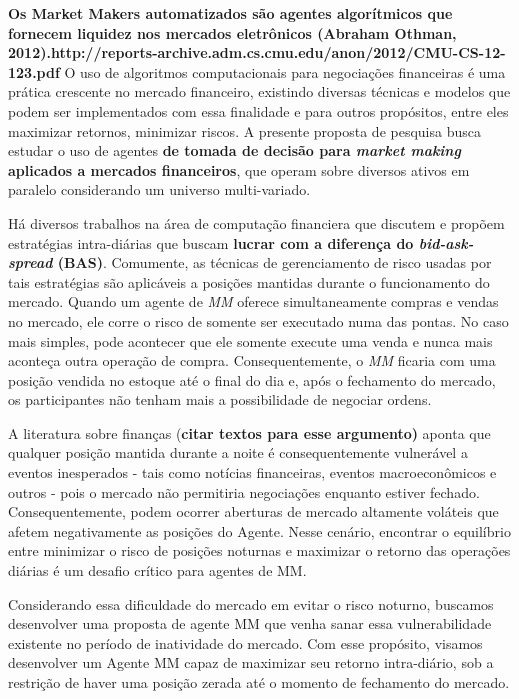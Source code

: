 \textbf{Os Market Makers automatizados são agentes algorítmicos que fornecem liquidez nos mercados eletrônicos (Abraham Othman, 2012).http://reports-archive.adm.cs.cmu.edu/anon/2012/CMU-CS-12-123.pdf} O uso de algoritmos computacionais para negociações financeiras é uma prática crescente no mercado financeiro, existindo diversas técnicas e modelos que podem ser implementados com essa finalidade e para outros propósitos, entre eles maximizar retornos, minimizar riscos. A presente proposta de pesquisa busca estudar o uso de agentes \textbf{de tomada de decisão para \textit{market making} aplicados a mercados financeiros}, que operam sobre diversos ativos em paralelo considerando um universo multi-variado.  


Há diversos trabalhos na área de computação financiera que discutem e propõem estratégias intra-diárias que buscam \textbf{lucrar com a diferença do \textit{bid-ask-spread} (BAS)}. Comumente, as técnicas de gerenciamento de risco usadas por tais estratégias são aplicáveis a posições mantidas durante o funcionamento do mercado. Quando um agente de \textit{MM} oferece simultaneamente compras e vendas no mercado, ele corre o risco de somente ser executado numa das pontas. No caso mais simples, pode acontecer que ele somente execute uma venda e nunca mais aconteça outra operação de compra. Consequentemente, o \textit{MM} ficaria com uma posição vendida no estoque até o final do dia e, após o fechamento do mercado, os participantes não tenham mais a possibilidade de negociar ordens.

A literatura sobre finanças (\textbf{citar textos para esse argumento) }aponta que qualquer posição mantida durante a noite é consequentemente vulnerável a eventos inesperados - tais como notícias financeiras, eventos macroeconômicos e outros - pois o mercado não permitiria negociações enquanto estiver fechado. Consequentemente, podem ocorrer aberturas de mercado altamente voláteis que afetem negativamente as posições do Agente. Nesse cenário, encontrar o equilíbrio entre minimizar o risco de posições noturnas e maximizar o retorno das operações diárias é um desafio crítico para agentes de MM. 

Considerando essa dificuldade do mercado em evitar o risco noturno, buscamos desenvolver uma proposta de agente MM que venha sanar essa vulnerabilidade existente no período de inatividade do mercado. Com esse propósito, visamos desenvolver um Agente MM capaz de maximizar seu retorno intra-diário, sob a restrição de haver uma posição zerada até o momento de fechamento do mercado. 


